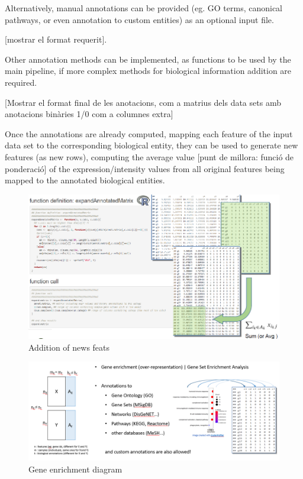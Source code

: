 \documentclass[a4paper, nobind]{templates/ociamthesis}
\begin{document}
Alternatively, manual annotations can be provided (eg. GO terms, canonical pathways, or even annotation to custom entities) as an optional input file.

{[}mostrar el format requerit{]}.

Other annotation methods can be implemented, as functions to be used by the main pipeline, if more complex methods for biological information addition are required.

{[}Mostrar el format final de les anotacions, com a matrius dels data sets amb anotacions binàries 1/0 com a columnes extra{]}

Once the annotations are already computed, mapping each feature of the input data set to the corresponding biological entity, they can be used to generate new features (as new rows), computing the average value {[}punt de millora: funció de ponderació{]} of the expression/intensity values from all original features being mapped to the annotated biological entities.

\begin{figure}

{\centering \includegraphics[width=0.95\linewidth]{figures/chapter3/3-2_addition_of_new_feats} 

}

\caption{Addition of news feats}\label{fig:fig3-2}
\end{figure}

\begin{figure}

{\centering \includegraphics[width=0.95\linewidth]{figures/chapter3/3-3_gene_enrichment_diagram} 

}

\caption{Gene enrichment diagram}\label{fig:fig3-3}
\end{figure}
\end{document}
